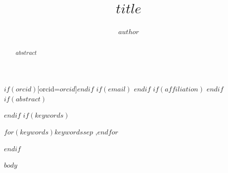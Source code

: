 \documentclass[a4paper,fleqn]{cas-sc}
\begin{document}
\title[mode=title]{$title$}
\author[1]{$author$}$if(orcid)$[orcid={$orcid$}]$endif$
$if(email)$
\cormark[1]
$endif$
$if(affiliation)$
$endif$
$if(abstract)$
\begin{abstract}
$abstract$
\end{abstract}
$endif$
$if(keywords)$
\begin{keywords}
$for(keywords)$$keywords$$sep$ \sep $endfor$
\end{keywords}
$endif$
\maketitle

$body$



\end{document}
